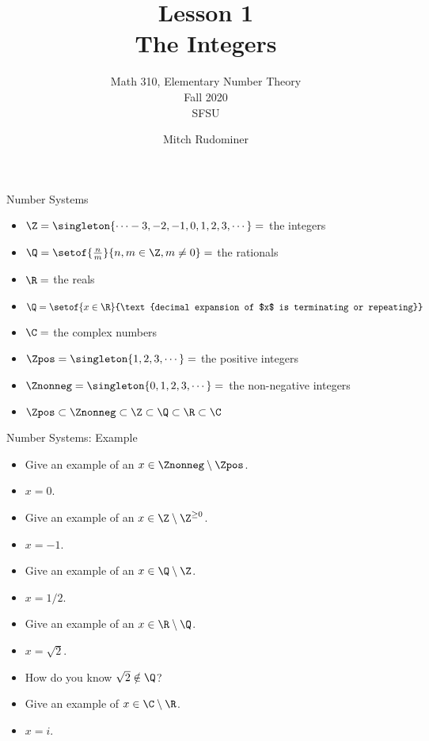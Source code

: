 \documentclass{beamer}
\title{Lesson 1 \\ The Integers}
\subtitle{Math 310, Elementary Number Theory \\ Fall 2020 \\ SFSU}
\author{Mitch Rudominer}
\date{}
\begin{document}
\begin{frame}
  \titlepage
\end{frame}


\begin{frame}{Number Systems}

  \begin{itemize}
  \item $\Z = \singleton{\cdots -3,-2,-1,0,1,2,3,\cdots} = $ the integers
  \item $\Q = \setof{\frac{n}{m}}{n,m\in \Z, m\not= 0} = $ the rationals
  \item $\R = $ the reals
  \item $\Q = \setof{x\in\R}{\text{decimal expansion of $x$ is terminating or repeating}}$
  \item $\C = $ the complex numbers
  \item $\Zpos = \singleton{1,2,3,\cdots} =$ the positive integers
  \item $\Znonneg = \singleton{0,1,2,3,\cdots} =$ the non-negative integers
  \item  $\Zpos \subset \Znonneg \subset \Z \subset \Q \subset \R \subset \C$
  \end{itemize}


\end{frame}

\begin{frame}{Number Systems: Example}
\begin{itemize}
  \item  Give an example of an $x\in \Znonneg \setminus \Zpos$.
  \item $x=0$.
  \item  Give an example of an $x\in \Z \setminus \Z^{\geq 0}$.
  \item $x=-1$.
  \item  Give an example of an $x\in \Q \setminus \Z$.
  \item $x=1/2$.
  \item  Give an example of an $x\in \R \setminus \Q$.
  \item $x=\sqrt{2}$.
  \item How do you know $\sqrt{2}\notin \Q$?
  \item Give an example of $x\in\C \setminus \R$.
  \item $x=i$.
  \end{itemize}
\end{frame}
\end{document}
